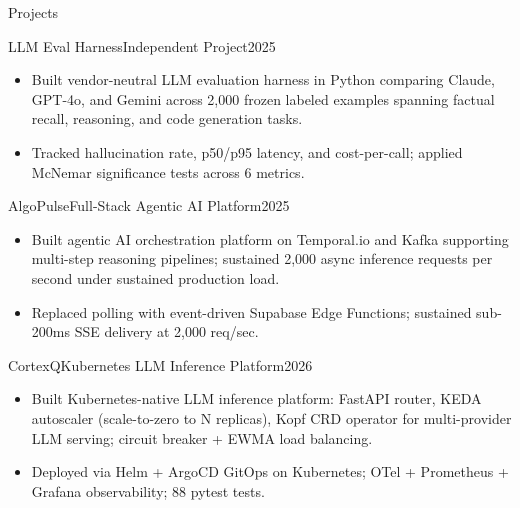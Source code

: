 \documentclass[]{mcdowellcv}
\begin{document}
\begin{cvsection}{Projects}
  \begin{cvsubsection}{LLM Eval Harness}{Independent Project}{2025}
    \begin{itemize}
      \item Built vendor-neutral LLM evaluation harness in Python comparing Claude, GPT-4o, and Gemini across 2,000 frozen labeled examples spanning factual recall, reasoning, and code generation tasks.
      \item Tracked hallucination rate, p50/p95 latency, and cost-per-call; applied McNemar significance tests across 6 metrics.
    \end{itemize}
    \vspace{-1.5pt}
  \end{cvsubsection}

  \begin{cvsubsection}{AlgoPulse}{Full-Stack Agentic AI Platform}{2025}
    \begin{itemize}
      \item Built agentic AI orchestration platform on Temporal.io and Kafka supporting multi-step reasoning pipelines; sustained 2,000 async inference requests per second under sustained production load.
      \item Replaced polling with event-driven Supabase Edge Functions; sustained sub-200ms SSE delivery at 2,000 req/sec.
    \end{itemize}
    \vspace{-1.5pt}
  \end{cvsubsection}

  \begin{cvsubsection}{CortexQ}{Kubernetes LLM Inference Platform}{2026}
    \begin{itemize}
      \item Built Kubernetes-native LLM inference platform: FastAPI router, KEDA autoscaler (scale-to-zero to N replicas), Kopf CRD operator for multi-provider LLM serving; circuit breaker + EWMA load balancing.
      \item Deployed via Helm + ArgoCD GitOps on Kubernetes; OTel + Prometheus + Grafana observability; 88 pytest tests.
    \end{itemize}
  \end{cvsubsection}
\end{cvsection}
\end{document}
